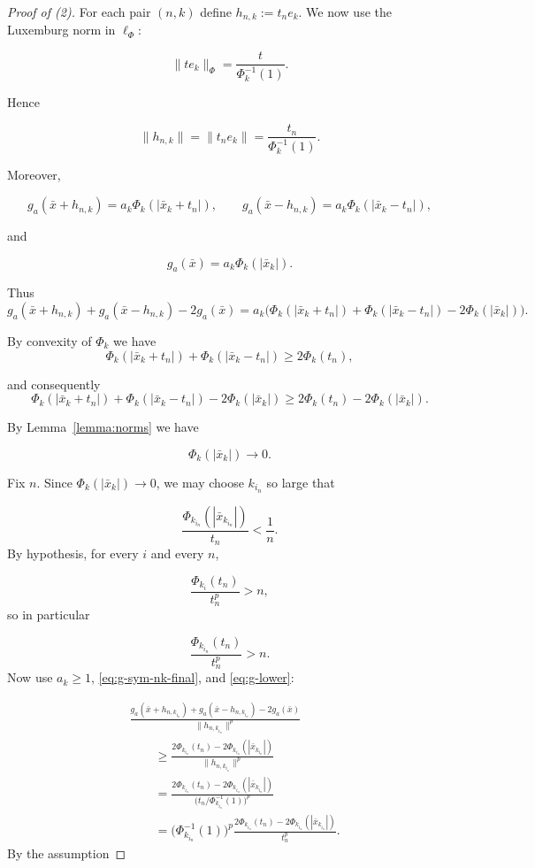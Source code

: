 \documentclass[12pt]{article}
\theoremstyle{thmstyleone}%
\theoremstyle{thmstyletwo}%
\theoremstyle{thmstylethree}%
\begin{document}
{{\begin{proof}[Proof of (2)]
For each pair $(n,k)$ define $h_{n,k}:=t_n e_k$. We now use the
Luxemburg norm in $\ell_\Phi$:


\[
  \|t e_k\|_\Phi = \frac{t}{\Phi_k^{-1}(1)}.
\]


Hence


\[
  \|h_{n,k}\|
  = \|t_n e_k\|
  = \frac{t_n}{\Phi_k^{-1}(1)}.
\]



Moreover,


\[
  g_a(\bar x+h_{n,k})
  =a_k\Phi_k(|\bar x_k+t_n|),\qquad
  g_a(\bar x-h_{n,k})
  =a_k\Phi_k(|\bar x_k-t_n|),
\]


and


\[
  g_a(\bar x)=a_k\Phi_k(|\bar x_k|).
\]


Thus
\begin{equation}\label{eq:g-sym-nk-final}
  g_a(\bar x+h_{n,k})+g_a(\bar x-h_{n,k})-2g_a(\bar x)
  =
  a_k\Big(
    \Phi_k(|\bar x_k+t_n|)
    +\Phi_k(|\bar x_k-t_n|)
    -2\Phi_k(|\bar x_k|)
  \Big).
\end{equation}

By convexity of $\Phi_k$ we have
\[
  \Phi_k(|\bar x_k+t_n|)+\Phi_k(|\bar x_k-t_n|)
  \ge 2\Phi_k(t_n),
\]


and consequently
\begin{equation}\label{eq:g-lower}
  \Phi_k(|\bar x_k+t_n|)
  +\Phi_k(|\bar x_k-t_n|)
  -2\Phi_k(|\bar x_k|)
  \ge
  2\Phi_k(t_n)-2\Phi_k(|\bar x_k|).
\end{equation}

By Lemma~\ref{lemma:norms} we have


\[
  \Phi_k(|\bar x_k|)\longrightarrow 0.
\]


Fix $n$. Since $\Phi_k(|\bar x_k|)\to 0$, we may choose $k_{i_n}$ so
large that


\[
  \frac{\Phi_{k_{i_n}}(|\bar x_{k_{i_n}}|)}{t_n}<\frac1n.
\]
By hypothesis, for every $i$ and every $n$,


\[
  \frac{\Phi_{k_i}(t_n)}{t_n^p}>n,
\]
so in particular


\[
  \frac{\Phi_{k_{i_n}}(t_n)}{t_n^p}>n.
\]
Now use $a_k\ge 1$, \eqref{eq:g-sym-nk-final}, and \eqref{eq:g-lower}:


\[
\begin{aligned}
  &\frac{
    g_a(\bar x+h_{n,k_{i_n}})
    +g_a(\bar x-h_{n,k_{i_n}})
    -2g_a(\bar x)
  }{\|h_{n,k_{i_n}}\|^p}
  \\[1mm]
  &\qquad\ge
  \frac{
    2\Phi_{k_{i_n}}(t_n)-2\Phi_{k_{i_n}}(|\bar x_{k_{i_n}}|)
  }{\|h_{n,k_{i_n}}\|^p}
  \\
  &\qquad=
  \frac{
    2\Phi_{k_{i_n}}(t_n)-2\Phi_{k_{i_n}}(|\bar x_{k_{i_n}}|)
  }{\big(t_n/\Phi_{k_{i_n}}^{-1}(1)\big)^p}
  \\
  &\qquad=
  \Big(\Phi_{k_{i_n}}^{-1}(1)\Big)^p
  \frac{
    2\Phi_{k_{i_n}}(t_n)-2\Phi_{k_{i_n}}(|\bar x_{k_{i_n}}|)
  }{t_n^p}.
\end{aligned}
\]
By the assumption



\end{proof}}}
\end{document}
